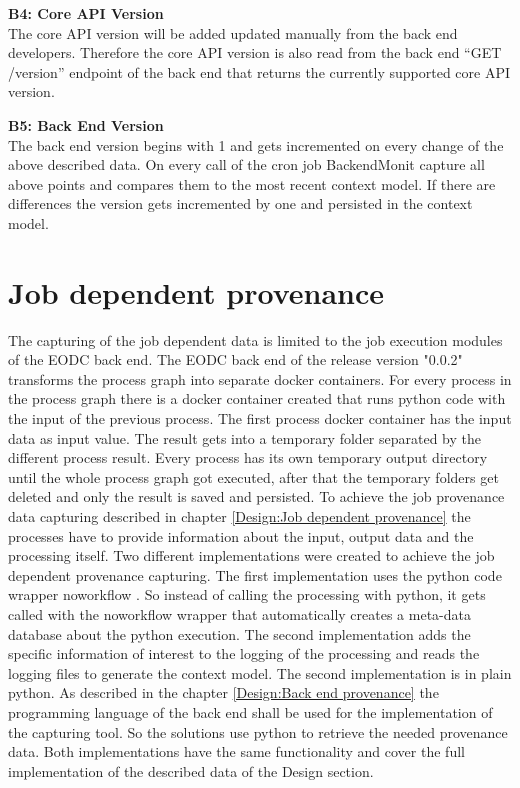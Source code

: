 \documentclass[draft,final]{vutinfth} %
\begin{document}
\textbf{B4: Core API Version} \\
The core API version will be added updated manually from the back end developers. Therefore the core API version is also read from the back end “GET /version” endpoint of the back end that returns the currently supported core API version. 

\textbf{B5: Back End Version} \\
The back end version begins with 1 and gets incremented on every change of the above described data. On every call of the cron job BackendMonit capture all above points and compares them to the most recent context model. If there are differences the version gets incremented by one and persisted in the context model. 


\section{Job dependent provenance}\label{Implementation:Job dependent provenance}
The capturing of the job dependent data is limited to the job execution modules of the EODC back end. The EODC back end of the release version "0.0.2" transforms the process graph into separate docker containers. For every process in the process graph there is a docker container created that runs python code with the input of the previous process. The first process docker container has the input data as input value. The result gets into a temporary folder separated by the different process result. Every process has its own temporary output directory until the whole process graph got executed, after that the temporary folders get deleted and only the result is saved and persisted.
To achieve the job provenance data capturing described in chapter \ref{Design:Job dependent provenance} the processes have to provide information about the input, output data and the processing itself. Two different implementations were created to achieve the job dependent provenance capturing. The first implementation uses the python code wrapper noworkflow \cite{c9e0604becba42af96a9cb0a6f60018b}. So instead of calling the processing with python, it gets called with the noworkflow wrapper that automatically creates a meta-data database about the python execution. The second implementation adds the specific information of interest to the logging of the processing and reads the logging files to generate the context model. The second implementation is in plain python. As described in the chapter \ref{Design:Back end provenance} the programming language of the back end shall be used for the implementation of the capturing tool. So the solutions use python to retrieve the needed provenance data. Both implementations have the same functionality and cover the full implementation of the described data of the Design section. 
\end{document}
